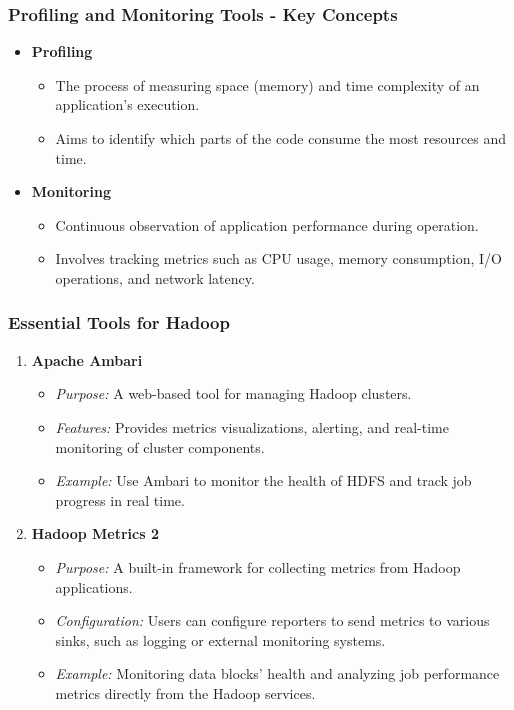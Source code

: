 \documentclass[aspectratio=169]{beamer}
\begin{document}
\begin{frame}[fragile]
    \frametitle{Profiling and Monitoring Tools - Key Concepts}
    \begin{itemize}
        \item \textbf{Profiling}
            \begin{itemize}
                \item The process of measuring space (memory) and time complexity of an application’s execution.
                \item Aims to identify which parts of the code consume the most resources and time.
            \end{itemize}
        \item \textbf{Monitoring}
            \begin{itemize}
                \item Continuous observation of application performance during operation.
                \item Involves tracking metrics such as CPU usage, memory consumption, I/O operations, and network latency.
            \end{itemize}
    \end{itemize}
\end{frame}

\begin{frame}[fragile]
    \frametitle{Essential Tools for Hadoop}
    \begin{enumerate}
        \item \textbf{Apache Ambari}
            \begin{itemize}
                \item \textit{Purpose:} A web-based tool for managing Hadoop clusters.
                \item \textit{Features:} Provides metrics visualizations, alerting, and real-time monitoring of cluster components.
                \item \textit{Example:} Use Ambari to monitor the health of HDFS and track job progress in real time.
            \end{itemize}
        \item \textbf{Hadoop Metrics 2}
            \begin{itemize}
                \item \textit{Purpose:} A built-in framework for collecting metrics from Hadoop applications.
                \item \textit{Configuration:} Users can configure reporters to send metrics to various sinks, such as logging or external monitoring systems.
                \item \textit{Example:} Monitoring data blocks' health and analyzing job performance metrics directly from the Hadoop services.
            \end{itemize}
    \end{enumerate}
\end{frame}
\end{document}

